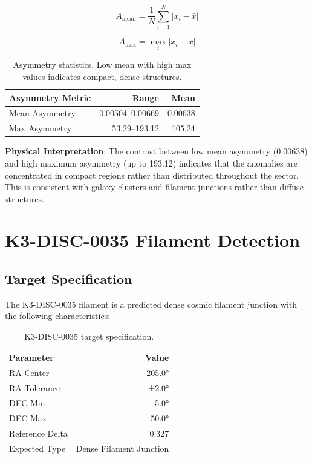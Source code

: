 \documentclass[11pt,a4paper]{article}
\begin{document}
\begin{equation}
A_{\text{mean}} = \frac{1}{N} \sum_{i=1}^{N} |x_i - \bar{x}|
\end{equation}

\begin{equation}
A_{\text{max}} = \max_i |x_i - \bar{x}|
\end{equation}

\begin{table}[h]
\centering
\begin{tabular}{lrr}
\toprule
\textbf{Asymmetry Metric} & \textbf{Range} & \textbf{Mean} \\
\midrule
Mean Asymmetry & 0.00504--0.00669 & 0.00638 \\
Max Asymmetry & 53.29--193.12 & 105.24 \\
\bottomrule
\end{tabular}
\caption{Asymmetry statistics. Low mean with high max values indicates compact, dense structures.}
\label{tab:asymmetry}
\end{table}

\textbf{Physical Interpretation}: The contrast between low mean asymmetry (0.00638) and high maximum asymmetry (up to 193.12) indicates that the anomalies are concentrated in compact regions rather than distributed throughout the sector. This is consistent with galaxy clusters and filament junctions rather than diffuse structures.

\section{K3-DISC-0035 Filament Detection}

\subsection{Target Specification}

The K3-DISC-0035 filament is a predicted dense cosmic filament junction with the following characteristics:

\begin{table}[h]
\centering
\begin{tabular}{lr}
\toprule
\textbf{Parameter} & \textbf{Value} \\
\midrule
RA Center & 205.0° \\
RA Tolerance & ±2.0° \\
DEC Min & 5.0° \\
DEC Max & 50.0° \\
Reference Delta & 0.327 \\
Expected Type & Dense Filament Junction \\
\bottomrule
\end{tabular}
\caption{K3-DISC-0035 target specification.}
\label{tab:k3_spec}
\end{table}
\end{document}
